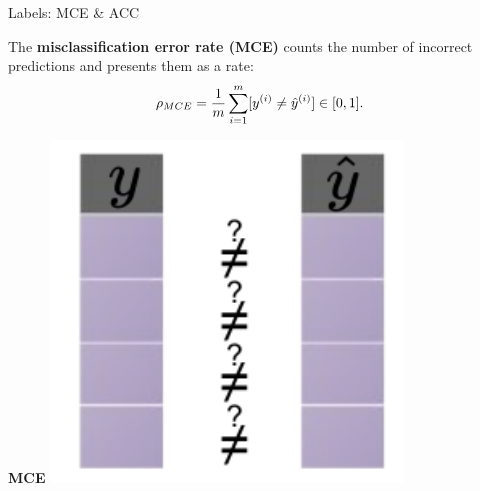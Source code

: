 
\begin{vbframe}{Labels: MCE \& ACC}

\begin{minipage}[t]{0.75\textwidth} 
  \small
  The \textbf{misclassification error rate (MCE)} counts the number of incorrect 
  predictions and presents them as a rate:
  $$ \rho_{MCE} = \frac{1}{m} \sum_{i = 1}^m [y^{(i)} \neq \hat{y}^{(i)}] \in [0, 1]. $$
\end{minipage}%
\begin{minipage}[t]{0.25\textwidth}
  \centering
  \begin{center}
    \textbf{MCE}
    \includegraphics[width=0.7\textwidth]
    {figure_man/eval-classif-loss-compare-mce.pdf}
  \end{center}
\end{minipage}

\lz


\end{vbframe}
